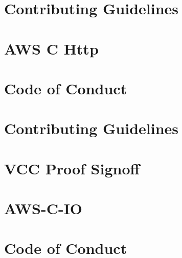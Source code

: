 \documentclass[twoside]{book}
\newcommand{\+}{\discretionary{\mbox{\scriptsize$\hookleftarrow$}}{}{}}
\begin{document}
\chapter{Contributing Guidelines}
\label{md_crt_aws_crt_cpp_crt_aws_c_http__c_o_n_t_r_i_b_u_t_i_n_g}

\chapter{AWS C Http}
\label{md_crt_aws_crt_cpp_crt_aws_c_http__r_e_a_d_m_e}

\chapter{Code of Conduct}
\label{md_crt_aws_crt_cpp_crt_aws_c_io__c_o_d_e__o_f__c_o_n_d_u_c_t}

\chapter{Contributing Guidelines}
\label{md_crt_aws_crt_cpp_crt_aws_c_io__c_o_n_t_r_i_b_u_t_i_n_g}

\chapter{VCC Proof Signoff}
\label{md_crt_aws_crt_cpp_crt_aws_c_io_docs_epoll_event_loop_proof}

\chapter{AWS-\/\+C-\/\+IO}
\label{md_crt_aws_crt_cpp_crt_aws_c_io__r_e_a_d_m_e}

\chapter{Code of Conduct}
\label{md_crt_aws_crt_cpp_crt_aws_c_mqtt__c_o_d_e__o_f__c_o_n_d_u_c_t}

\end{document}
